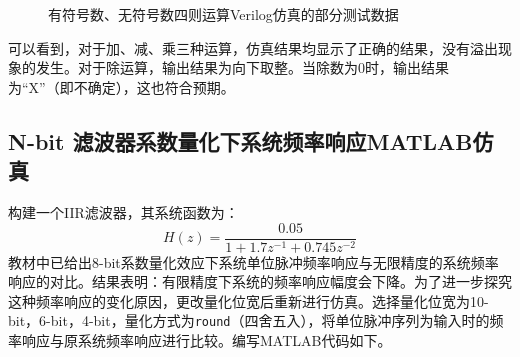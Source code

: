\begin{figure}[htbp]
  \centering
  \newline
  \newline
  \newline
  \caption{有符号数、无符号数四则运算Verilog仿真的部分测试数据}
  \label{fig:verilog_test}
\end{figure}

可以看到，对于加、减、乘三种运算，仿真结果均显示了正确的结果，没有溢出现象的发生。对于除运算，输出结果为向下取整。当除数为0时，输出结果为“X”（即不确定），这也符合预期。  

\subsection{N-bit 滤波器系数量化下系统频率响应MATLAB仿真}
构建一个IIR滤波器，其系统函数为：
\begin{equation}
  H(z) = \frac{0.05}{1+1.7z^{-1}+0.745z^{-2}}
\end{equation}
教材中已给出8-bit系数量化效应下系统单位脉冲频率响应与无限精度的系统频率响应的对比。结果表明：有限精度下系统的频率响应幅度会下降。为了进一步探究这种频率响应的变化原因，更改量化位宽后重新进行仿真。选择量化位宽为10-bit，6-bit，4-bit，量化方式为\texttt{round}（四舍五入），将单位脉冲序列为输入时的频率响应与原系统频率响应进行比较。编写MATLAB代码如下。


